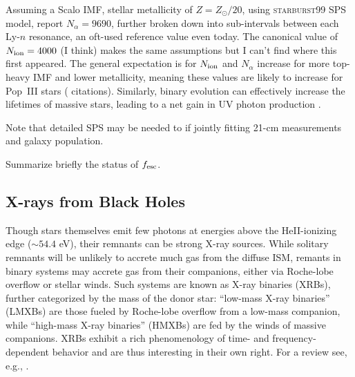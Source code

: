 Assuming a Scalo IMF, stellar metallicity of $Z=Z_{\odot}/20$, using \textsc{starburst99} SPS model, \cite{Barkana2001} report $N_{\alpha}=9690$, further broken down into sub-intervals between each Ly-$n$ resonance, an oft-used reference value even today. {\color{red} The canonical value of $N_{\text{ion}}=4000$ (I think) makes the same assumptions but I can't find where this first appeared.} The general expectation is for $N_{\text{ion}}$ and $N_{\alpha}$ increase for more top-heavy IMF and lower metallicity, meaning these values are likely to increase for Pop~III stars ({\color{red} citations}). Similarly, binary evolution can effectively increase the lifetimes of massive stars, leading to a net gain in UV photon production \cite{Stanway2016}.

{\color{red} Note that detailed SPS may be needed to if jointly fitting 21-cm measurements and galaxy population.}

{\color{red} Summarize briefly the status of $f_{\text{esc}}$.}



\subsection{X-rays from Black Holes}
Though stars themselves emit few photons at energies above the HeII-ionizing edge ($\sim 54.4$ eV), their remnants can be strong X-ray sources. While solitary remnants will be unlikely to accrete much gas from the diffuse ISM, remants in binary systems may accrete gas from their companions, either via Roche-lobe overflow or stellar winds. Such systems are known as X-ray binaries (XRBs), further categorized by the mass of the donor star: ``low-mass X-ray binaries'' (LMXBs) are those fueled by Roche-lobe overflow from a low-mass companion, while ``high-mass X-ray binaries'' (HMXBs) are fed by the winds of massive companions. XRBs exhibit a rich phenomenology of time- and frequency-dependent behavior and are thus interesting in their own right. For a review see, e.g., \cite{Remillard2006}.


